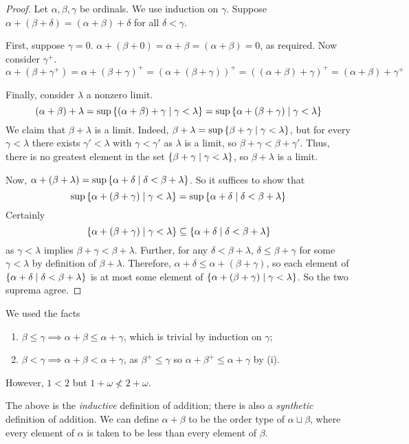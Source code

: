 \begin{proof}
    Let \( \alpha, \beta, \gamma \) be ordinals.
    We use induction on \( \gamma \).
    Suppose \( \alpha + (\beta + \delta) = (\alpha + \beta) + \delta \) for all \( \delta < \gamma \).

    First, suppose \( \gamma = 0 \).
    \( \alpha + (\beta + 0) = \alpha + \beta = (\alpha + \beta) = 0 \), as required.
    Now consider \( \gamma^+ \).
    \[ \alpha + (\beta + \gamma^+) = \alpha + (\beta + \gamma)^+ = (\alpha + (\beta + \gamma))^+ = ((\alpha + \beta) + \gamma)^+ = (\alpha + \beta) + \gamma^+ \]

    Finally, consider \( \lambda \) a nonzero limit.
    \[ (\alpha + \beta) + \lambda = \sup \qty{(\alpha + \beta) + \gamma \mid \gamma < \lambda} = \sup \qty{\alpha + (\beta + \gamma) \mid \gamma < \lambda} \]
    We claim that \( \beta + \lambda \) is a limit.
    Indeed, \( \beta + \lambda = \sup\qty{\beta + \gamma \mid \gamma < \lambda} \), but for every \( \gamma < \lambda \) there exists \( \gamma' < \lambda \) with \( \gamma < \gamma' \) as \( \lambda \) is a limit, so \( \beta + \gamma < \beta + \gamma' \).
    Thus, there is no greatest element in the set \( \qty{\beta + \gamma \mid \gamma < \lambda} \), so \( \beta + \lambda \) is a limit.

    Now, \( \alpha + (\beta + \lambda) = \sup\qty{\alpha + \delta \mid \delta < \beta + \lambda} \).
    So it suffices to show that
    \[ \sup\qty{\alpha + (\beta + \gamma) \mid \gamma < \lambda} = \sup\qty{\alpha + \delta \mid \delta < \beta + \lambda} \]
    Certainly
    \[ \qty{\alpha + (\beta + \gamma) \mid \gamma < \lambda} \subseteq \qty{\alpha + \delta \mid \delta < \beta + \lambda} \]
    as \( \gamma < \lambda \) implies \( \beta + \gamma < \beta + \lambda \).
    Further, for any \( \delta < \beta + \lambda \), \( \delta \leq \beta + \gamma \) for some \( \gamma < \lambda \) by definition of \( \beta + \lambda \).
    Therefore, \( \alpha + \delta \leq \alpha + (\beta + \gamma) \), so each element of \( \qty{\alpha + \delta \mid \delta < \beta + \lambda} \) is at most some element of \( \qty{\alpha + (\beta + \gamma) \mid \gamma < \lambda} \).
    So the two suprema agree.
\end{proof}
\begin{remark}
    We used the facts
    \begin{enumerate}
        \item \( \beta \leq \gamma \implies \alpha + \beta \leq \alpha + \gamma \), which is trivial by induction on \( \gamma \);
        \item \( \beta < \gamma \implies \alpha + \beta < \alpha + \gamma \), as \( \beta^+ \leq \gamma \) so \( \alpha + \beta^+ \leq \alpha + \gamma \) by (i).
    \end{enumerate}
    However, \( 1 < 2 \) but \( 1 + \omega \not < 2 + \omega \).
\end{remark}
The above is the \emph{inductive} definition of addition; there is also a \emph{synthetic} definition of addition.
We can define \( \alpha + \beta \) to be the order type of \( \alpha \sqcup \beta \), where every element of \( \alpha \) is taken to be less than every element of \( \beta \).

